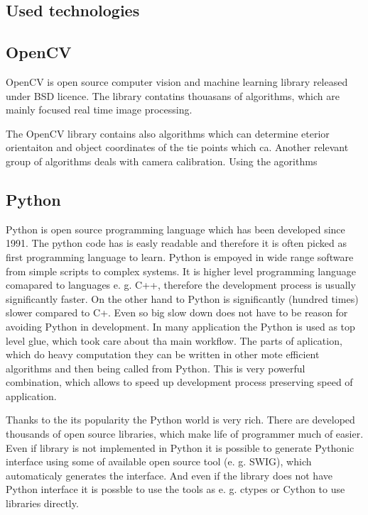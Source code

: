 \documentclass[a4paper,12pt]{report}
\begin{document}
\begin{itemize}
\section{Used technologies}

\subsection{OpenCV}

OpenCV is open source computer vision and machine learning library released under BSD licence. 
The library contatins thouasans of algorithms, which are mainly focused real time image processing.


The OpenCV library contains also algorithms which can determine eterior orientaiton and object coordinates 
of the tie points which ca. 
Another relevant group of algorithms deals with camera calibration. Using the agorithms

\subsection{Python}

Python is open source programming language which has been developed since 1991. 
The python code has is easly readable and therefore it is often picked as first programming
language to learn. Python is empoyed in wide range software from simple scripts to complex systems.
It is higher level programming language comapared to languages e. g. C++, therefore 
the development process is usually significantly faster. On the other hand 
to Python is significantly (hundred times) slower compared to C+. Even so big 
slow down does not have to be reason for avoiding Python in development. 
In many application the Python is used as top level glue, which took care about 
tha main workflow. The parts of aplication, which do heavy computation  they can 
be written in other mote efficient algorithms and then being called 
from Python. This is very powerful combination, which allows to speed up development 
process preserving speed of application.

Thanks to the its popularity the Python world is very rich. There are developed
thousands of open source libraries, which make life of programmer much of easier. Even 
if library is not implemented in Python it is possible to generate Pythonic 
interface using some of available open source tool (e. g. SWIG), which automaticaly
generates the interface. And even if the library does not have Python interface it 
is possble to use the tools as e. g. ctypes or Cython to use libraries directly.



\end{itemize}
\end{document}
